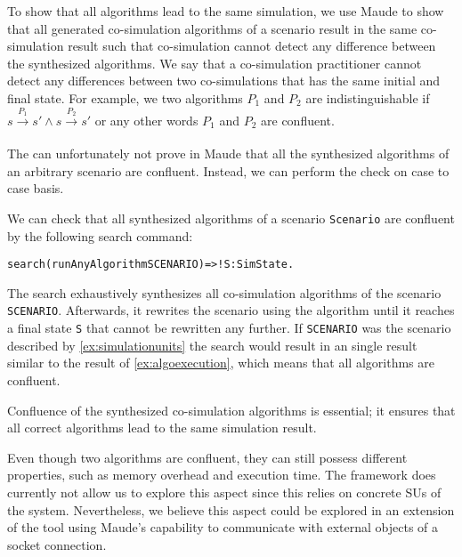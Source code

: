 To show that all algorithms lead to the same simulation, we use Maude to show that all generated co-simulation algorithms of a scenario result in the same co-simulation result such that co-simulation cannot detect any difference between the synthesized algorithms.
We say that a co-simulation practitioner cannot detect any differences between two co-simulations that has the same initial and final state.
For example, we two algorithms $P_1$ and $P_2$ are indistinguishable if $s \xrightarrow[\text{}]{P_1} s' \land s \xrightarrow[\text{}]{P_2} s'$ or any other words $P_1$ and $P_2$ are confluent.

The can unfortunately not prove in Maude that all the synthesized algorithms of an arbitrary scenario are confluent.
Instead, we can perform the check on case to case basis.  

\begin{example}
  We can check that all synthesized algorithms of a scenario \texttt{Scenario} are confluent by the following search command:
  \small
  \begin{alltt}
  search (runAnyAlgorithm SCENARIO)  =>! S:SimState . 
  \end{alltt}
\normalsize
The search exhaustively synthesizes all co-simulation algorithms of the scenario \texttt{SCENARIO}. 
Afterwards, it rewrites the scenario using the algorithm until it reaches a final state \texttt{S} that cannot be rewritten any further.
If \texttt{SCENARIO} was the scenario described by \cref{ex:simulationunits} the search would result in an single result similar to the result of \cref{ex:algoexecution}, which means that all algorithms are confluent.
\end{example}

Confluence of the synthesized co-simulation algorithms is essential; it ensures that all correct algorithms lead to the same simulation result.

Even though two algorithms are confluent, they can still possess different properties, such as memory overhead and execution time. 
The framework does currently not allow us to explore this aspect since this relies on concrete SUs of the system.
Nevertheless, we believe this aspect could be explored in an extension of the tool using Maude's capability to communicate with external objects of a socket connection.